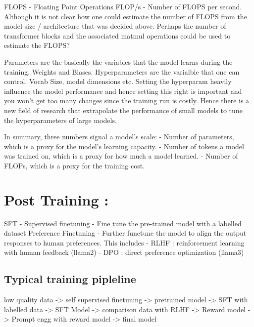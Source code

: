 \documentclass[
  letterpaper,
  DIV=11,
  numbers=noendperiod]{scrreprt}
\begin{document}
FLOPS - Floating Point Operations FLOP/s - Number of FLOPS per second.
Although it is not clear how one could estimate the number of FLOPS from
the model size / architecture that was decided above. Perhaps the number
of transformer blocks and the associated matmul operations could be used
to estimate the FLOPS?

Parameters are the basically the variables that the model learns during
the training. Weights and Biases. Hyperparameters are the varialble that
one can control. Vocab Size, model dimensions etc. Setting the
hyperparam heavily influence the model performance and hence setting
this right is important and you won't get too many changes since the
training run is costly. Hence there is a new field of research that
extrapolate the performance of small models to tune the hyperparameters
of large models.

In summary, three numbers signal a model's scale: - Number of
parameters, which is a proxy for the model's learning capacity. - Number
of tokens a model was trained on, which is a proxy for how much a model
learned. - Number of FLOPs, which is a proxy for the training cost.

\section*{Post Training :}\label{post-training}


SFT - Supervised finetuning - Fine tune the pre-trained model with a
labelled dataset Preference Finetuning - Further funetune the model to
align the output responses to human preferences. This includes - RLHF :
reinforcement learning with human feedback (llama2) - DPO : direct
preference optimization (llama3)

\subsection*{Typical training
pipleline}\label{typical-training-pipleline}

low quality data -\textgreater{} self supervised finetuning
-\textgreater{} pretrained model -\textgreater{} SFT with labelled data
-\textgreater{} SFT Model -\textgreater{} comparison data with RLHF
-\textgreater{} Reward model -\textgreater{} Prompt engg with reward
model -\textgreater{} final model
\end{document}
